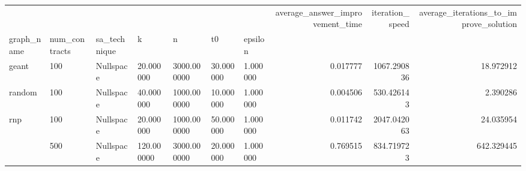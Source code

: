 \begin{tabular}{lllllllrrr}
\toprule
 &  &  &  &  &  &  & average_answer_improvement_time & iteration_speed & average_iterations_to_improve_solution \\
graph_name & num_contracts & sa_technique & k & n & t0 & epsilon &  &  &  \\
\midrule
geant & 100 & Nullspace & 20.000000 & 3000.000000 & 30.000000 & 1.000000 & 0.017777 & 1067.290836 & 18.972912 \\
\cline{1-10} \cline{2-10} \cline{3-10} \cline{4-10} \cline{5-10} \cline{6-10}
random & 100 & Nullspace & 40.000000 & 1000.000000 & 10.000000 & 1.000000 & 0.004506 & 530.426143 & 2.390286 \\
\cline{1-10} \cline{2-10} \cline{3-10} \cline{4-10} \cline{5-10} \cline{6-10}
\multirow[t]{2}{*}{rnp} & 100 & Nullspace & 20.000000 & 1000.000000 & 50.000000 & 1.000000 & 0.011742 & 2047.042063 & 24.035954 \\
\cline{2-10} \cline{3-10} \cline{4-10} \cline{5-10} \cline{6-10}
 & 500 & Nullspace & 120.000000 & 3000.000000 & 20.000000 & 1.000000 & 0.769515 & 834.719723 & 642.329445 \\
\cline{1-10} \cline{2-10} \cline{3-10} \cline{4-10} \cline{5-10} \cline{6-10}
\bottomrule
\end{tabular}
